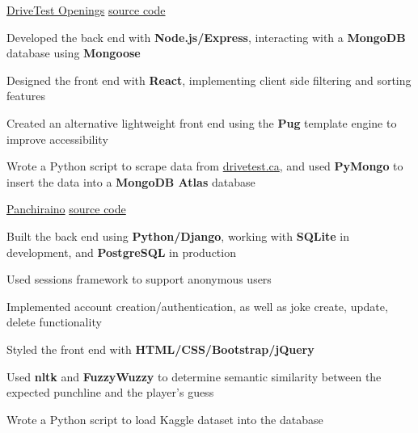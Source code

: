 
\begin{cventries}
  \cventry
    {\fontsize{10pt}{1em}\bodyfont\upshape{}} %
    {\href{http://drivetest-openings.herokuapp.com/}{DriveTest Openings}} %
    {\href{https://github.com/tacticaltofu/drivetest-openings}{source code}} %
    {} %
    {
      \begin{cvitems} %
        \item {Developed the back end with \textbf{Node.js/Express}, interacting with a \textbf{MongoDB} database using \textbf{Mongoose}}
		\item {Designed the front end with \textbf{React}, implementing client side filtering and sorting features}
		\item {Created an alternative lightweight front end using the \textbf{Pug} template engine to improve accessibility}
		\item{Wrote a Python script to scrape data from \href{https://drivetest.ca/}{drivetest.ca}, and used \textbf{PyMongo} to insert the data into a \textbf{MongoDB Atlas} database}
      \end{cvitems}
    }

  \cventry
    {\fontsize{10pt}{1em}\bodyfont\upshape\color{text}{Web based punchline guessing game}} %
    {\href{http://panchiraino.herokuapp.com/}{Panchiraino}} %
    {\href{https://github.com/tacticaltofu/guesser}{source code}} %
    {} %
    {
      \begin{cvitems} %
        \item {Built the back end using \textbf{Python/Django}, working with \textbf{SQLite} in development, and \textbf{PostgreSQL} in production}
        \item {Used sessions framework to support anonymous users}
        \item {Implemented account creation/authentication, as well as joke create, update, delete functionality}
        \item {Styled the front end with \textbf{HTML/CSS/Bootstrap/jQuery}}
        \item {Used \textbf{nltk} and \textbf{FuzzyWuzzy} to determine semantic similarity between the expected punchline and the player's guess}
        \item {Wrote a Python script to load Kaggle dataset into the database}
      \end{cvitems}
    }
    

\end{cventries}
